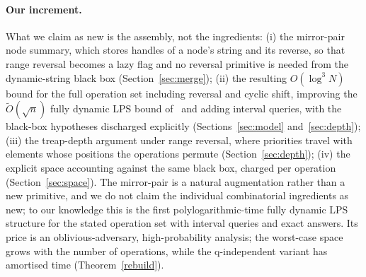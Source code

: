 ﻿\documentclass[11pt]{article}
\theoremstyle{plain}
\theoremstyle{remark}
\begin{document}
\paragraph{Our increment.} What we claim as new is the assembly, not the ingredients: (i) the mirror-pair node summary, which stores handles of a node's string and its reverse, so that range reversal becomes a lazy flag and no reversal primitive is needed from the dynamic-string black box (Section~\ref{sec:merge}); (ii) the resulting $O(\log^3N)$ bound for the full operation set including reversal and cyclic shift, improving the $\tilde O(\sqrt n)$ fully dynamic LPS bound of~\cite{ACPR18} and adding interval queries, with the black-box hypotheses discharged explicitly (Sections~\ref{sec:model} and~\ref{sec:depth}); (iii) the treap-depth argument under range reversal, where priorities travel with elements whose positions the operations permute (Section~\ref{sec:depth}); (iv) the explicit space accounting against the same black box, charged per operation (Section~\ref{sec:space}). The mirror-pair is a natural augmentation rather than a new primitive, and we do not claim the individual combinatorial ingredients as new; to our knowledge this is the first polylogarithmic-time fully dynamic LPS structure for the stated operation set with interval queries and exact answers. Its price is an oblivious-adversary, high-probability analysis; the worst-case space grows with the number of operations, while the q-independent variant has amortised time (Theorem~\ref{rebuild}).
\end{document}
